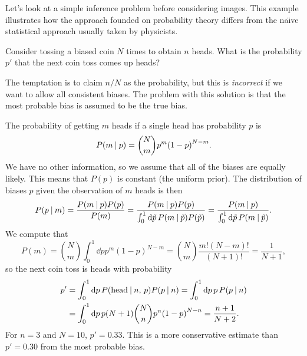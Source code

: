 \documentclass[../notebook.tex]{subfiles}
\begin{document}

Let's look at a simple inference problem before considering images. This example
illustrates how the approach founded on probability theory differs from the
na\"{\i}ve statistical approach usually taken by physicists.

\begin{eg}
  Consider tossing a biased coin $N$ times to obtain $n$ heads. What is the
  probability $p'$ that the next coin toss comes up heads?
\end{eg}

\noindent
The temptation is to claim $n/N$ as the probability, but this is
\emph{incorrect} if we want to allow all consistent biases. The problem with
this solution is that the most probable bias is assumed to be the true bias.

The probability of getting $m$ heads if a single head has probability $p$ is
\[
  P(m \mathbin{|} p)
  = \binom{N}{m} p^m {(1 - p)}^{N-m}.
\]
We have no other information, so we assume that all of the biases are equally
likely. This means that $P(p)$ is constant (the uniform prior). The distribution
of biases $p$ given the observation of $m$ heads is then
\[
  P(p \gv m)
  = \frac{P(m \gv p)P(p)}{P(m)}
  = \frac{P(m \gv p)P(p)}{%
  \int_0^1 \dd{\tilde{p}} P(m \gv \tilde{p})P(\tilde{p})}
  = \frac{P(m \gv p)}{\int_0^1 \dd{\tilde{p}} P(m \gv \tilde{p})}.
\]
We compute that
\[
  P(m)
  = \binom{N}{m} \int_0^1 \dd{p} p^m {(1 - p)}^{N-m}
  = \binom{N}{m}\frac{m! (N - m)!}{(N + 1)!}
  = \frac{1}{N + 1},
\]
so the next coin toss is heads with probability
\begin{align}
  p'
  &= \int_0^1 \dd{p} P(\text{head} \mathbin{|} n,\, p) P(p \mathbin{|} n)
  = \int_0^1 \dd{p} p \, P(p \mathbin{|} n) \\
  &= \int_0^1 \dd{p} p (N + 1) \binom{N}{n} p^n {(1 - p)}^{N - n}
  = \frac{n+1}{N+2}.
\end{align}
For $n = 3$ and $N = 10$, $p' = 0.33$. This is a more conservative estimate than
$p' = 0.30$ from the most probable bias.
\end{document}
